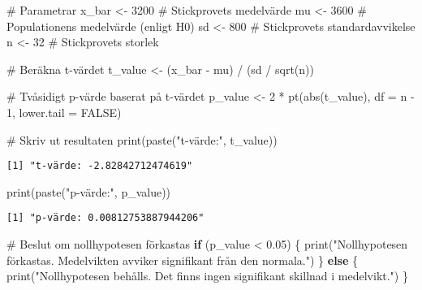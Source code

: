 \documentclass[
  letterpaper,
  DIV=11,
  numbers=noendperiod]{scrartcl}
\newenvironment{Shaded}{\begin{snugshade}}{\end{snugshade}}
\newcommand{\AttributeTok}[1]{\textcolor[rgb]{0.40,0.45,0.13}{#1}}
\newcommand{\CommentTok}[1]{\textcolor[rgb]{0.37,0.37,0.37}{#1}}
\newcommand{\ConstantTok}[1]{\textcolor[rgb]{0.56,0.35,0.01}{#1}}
\newcommand{\ControlFlowTok}[1]{\textcolor[rgb]{0.00,0.23,0.31}{\textbf{#1}}}
\newcommand{\DecValTok}[1]{\textcolor[rgb]{0.68,0.00,0.00}{#1}}
\newcommand{\FloatTok}[1]{\textcolor[rgb]{0.68,0.00,0.00}{#1}}
\newcommand{\FunctionTok}[1]{\textcolor[rgb]{0.28,0.35,0.67}{#1}}
\newcommand{\NormalTok}[1]{\textcolor[rgb]{0.00,0.23,0.31}{#1}}
\newcommand{\OtherTok}[1]{\textcolor[rgb]{0.00,0.23,0.31}{#1}}
\newcommand{\SpecialCharTok}[1]{\textcolor[rgb]{0.37,0.37,0.37}{#1}}
\newcommand{\StringTok}[1]{\textcolor[rgb]{0.13,0.47,0.30}{#1}}
\begin{document}
\begin{Shaded}
\begin{Highlighting}[]
\CommentTok{\# Parametrar}
\NormalTok{x\_bar }\OtherTok{\textless{}{-}} \DecValTok{3200}        \CommentTok{\# Stickprovets medelvärde}
\NormalTok{mu }\OtherTok{\textless{}{-}} \DecValTok{3600}           \CommentTok{\# Populationens medelvärde (enligt H0)}
\NormalTok{sd }\OtherTok{\textless{}{-}} \DecValTok{800}            \CommentTok{\# Stickprovets standardavvikelse}
\NormalTok{n }\OtherTok{\textless{}{-}} \DecValTok{32}              \CommentTok{\# Stickprovets storlek}

\CommentTok{\# Beräkna t{-}värdet}
\NormalTok{t\_value }\OtherTok{\textless{}{-}}\NormalTok{ (x\_bar }\SpecialCharTok{{-}}\NormalTok{ mu) }\SpecialCharTok{/}\NormalTok{ (sd }\SpecialCharTok{/} \FunctionTok{sqrt}\NormalTok{(n))}

\CommentTok{\# Tvåsidigt p{-}värde baserat på t{-}värdet}
\NormalTok{p\_value }\OtherTok{\textless{}{-}} \DecValTok{2} \SpecialCharTok{*} \FunctionTok{pt}\NormalTok{(}\FunctionTok{abs}\NormalTok{(t\_value), }\AttributeTok{df =}\NormalTok{ n }\SpecialCharTok{{-}} \DecValTok{1}\NormalTok{, }\AttributeTok{lower.tail =} \ConstantTok{FALSE}\NormalTok{)}

\CommentTok{\# Skriv ut resultaten}
\FunctionTok{print}\NormalTok{(}\FunctionTok{paste}\NormalTok{(}\StringTok{"t{-}värde:"}\NormalTok{, t\_value))}
\end{Highlighting}
\end{Shaded}

\begin{verbatim}
[1] "t-värde: -2.82842712474619"
\end{verbatim}

\begin{Shaded}
\begin{Highlighting}[]
\FunctionTok{print}\NormalTok{(}\FunctionTok{paste}\NormalTok{(}\StringTok{"p{-}värde:"}\NormalTok{, p\_value))}
\end{Highlighting}
\end{Shaded}

\begin{verbatim}
[1] "p-värde: 0.00812753887944206"
\end{verbatim}

\begin{Shaded}
\begin{Highlighting}[]
\CommentTok{\# Beslut om nollhypotesen förkastas}
\ControlFlowTok{if}\NormalTok{ (p\_value }\SpecialCharTok{\textless{}} \FloatTok{0.05}\NormalTok{) \{}
  \FunctionTok{print}\NormalTok{(}\StringTok{"Nollhypotesen förkastas. Medelvikten avviker signifikant från den normala."}\NormalTok{)}
\NormalTok{\} }\ControlFlowTok{else}\NormalTok{ \{}
  \FunctionTok{print}\NormalTok{(}\StringTok{"Nollhypotesen behålls. Det finns ingen signifikant skillnad i medelvikt."}\NormalTok{)}
\NormalTok{\}}
\end{Highlighting}
\end{Shaded}
\end{document}
